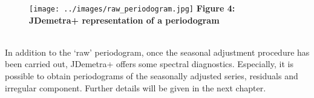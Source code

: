 \documentclass{article}
\begin{document}
\begin{figure}[h!]
\texttt{[image: ../images/raw\_periodogram.jpg]}
\centering
{\textbf{\scriptsize Figure 4: JDemetra+ representation of a periodogram}}
\end{figure}
\\In addition to the ‘raw’ periodogram, once the seasonal adjustment procedure has been carried out, JDemetra+ offers some spectral diagnostics. Especially, it is possible to obtain periodograms of the seasonally adjusted series, residuals and irregular component. Further details will be given in the next chapter.
\end{document}
